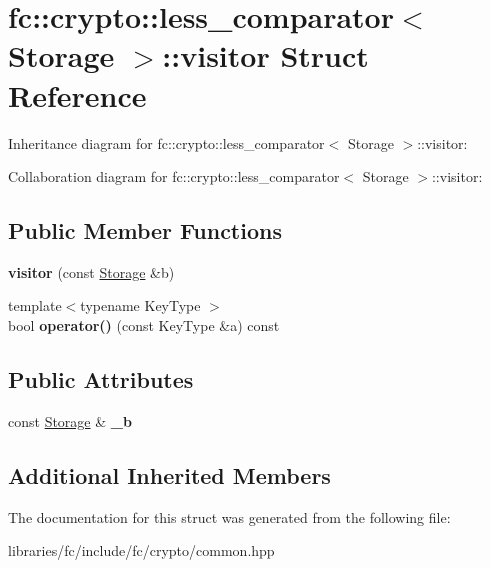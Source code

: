 \hypertarget{structfc_1_1crypto_1_1less__comparator_1_1visitor}{}\section{fc\+:\+:crypto\+:\+:less\+\_\+comparator$<$ Storage $>$\+:\+:visitor Struct Reference}
\label{structfc_1_1crypto_1_1less__comparator_1_1visitor}


Inheritance diagram for fc\+:\+:crypto\+:\+:less\+\_\+comparator$<$ Storage $>$\+:\+:visitor\+:


Collaboration diagram for fc\+:\+:crypto\+:\+:less\+\_\+comparator$<$ Storage $>$\+:\+:visitor\+:
\subsection*{Public Member Functions}
\begin{DoxyCompactItemize}
\item 
\mbox{\label{structfc_1_1crypto_1_1less__comparator_1_1visitor_a486879c38f400a411b00edf25a5aae2c}} 
{\bfseries visitor} (const \mbox{\hyperlink{struct_storage}{Storage}} \&b)
\item 
\mbox{\label{structfc_1_1crypto_1_1less__comparator_1_1visitor_a32193499cd343efb5f0c2854c7439666}} 
{\footnotesize template$<$typename Key\+Type $>$ }\\bool {\bfseries operator()} (const Key\+Type \&a) const
\end{DoxyCompactItemize}
\subsection*{Public Attributes}
\begin{DoxyCompactItemize}
\item 
\mbox{\label{structfc_1_1crypto_1_1less__comparator_1_1visitor_a16e50a9be9f30c8cfa41e66ca78c6a62}} 
const \mbox{\hyperlink{struct_storage}{Storage}} \& {\bfseries \+\_\+b}
\end{DoxyCompactItemize}
\subsection*{Additional Inherited Members}


The documentation for this struct was generated from the following file\+:\begin{DoxyCompactItemize}
\item 
libraries/fc/include/fc/crypto/common.\+hpp\end{DoxyCompactItemize}
